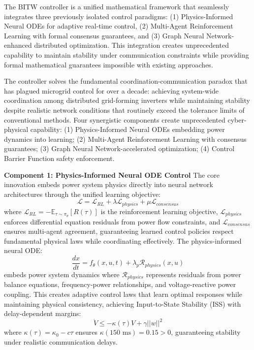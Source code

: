 \documentclass[12pt]{article}
\begin{document}
The BITW controller is a unified mathematical framework that seamlessly integrates three previously isolated control paradigms: (1) Physics-Informed Neural ODEs for adaptive real-time control, (2) Multi-Agent Reinforcement Learning with formal consensus guarantees, and (3) Graph Neural Network-enhanced distributed optimization. This integration creates unprecedented capability to maintain stability under communication constraints while providing formal mathematical guarantees impossible with existing approaches.

The controller solves the fundamental coordination-communication paradox that has plagued microgrid control for over a decade: achieving system-wide coordination among distributed grid-forming inverters while maintaining stability despite realistic network conditions that routinely exceed the tolerance limits of conventional methods. Four synergistic components create unprecedented cyber-physical capability: (1) Physics-Informed Neural ODEs embedding power dynamics into learning; (2) Multi-Agent Reinforcement Learning with consensus guarantees; (3) Graph Neural Network-accelerated optimization; (4) Control Barrier Function safety enforcement.

\textbf{Component 1: Physics-Informed Neural ODE Control}
The core innovation embeds power system physics directly into neural network architectures through the unified learning objective:
$$\mathcal{L} = \mathcal{L}_{RL} + \lambda \mathcal{L}_{physics} + \mu \mathcal{L}_{consensus}$$
where $\mathcal{L}_{RL} = -\mathbb{E}_{\tau \sim \pi_\theta}[R(\tau)]$ is the reinforcement learning objective, $\mathcal{L}_{physics}$ enforces differential equation residuals from power flow constraints, and $\mathcal{L}_{consensus}$ ensures multi-agent agreement, guaranteeing learned control policies respect fundamental physical laws while coordinating effectively. The physics-informed neural ODE:
$$\frac{dx}{dt} = f_\theta(x, u, t) + \lambda_p \mathcal{R}_{physics}(x, u)$$
embeds power system dynamics where $\mathcal{R}_{physics}$ represents residuals from power balance equations, frequency-power relationships, and voltage-reactive power coupling. This creates adaptive control laws that learn optimal responses while maintaining physical consistency, achieving Input-to-State Stability (ISS) with delay-dependent margins:
$$\dot{V} \leq -\kappa(\tau)V + \gamma||w||^2$$
where $\kappa(\tau) = \kappa_0 - c\tau$ ensures $\kappa(150\text{ ms}) = 0.15 > 0$, guaranteeing stability under realistic communication delays.
\end{document}

